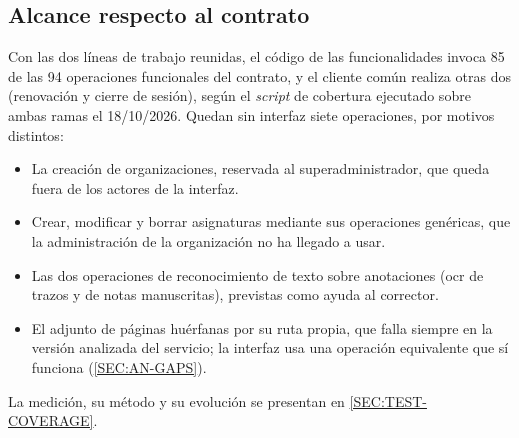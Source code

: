 \subsection{Alcance respecto al contrato}

Con las dos líneas de trabajo reunidas, el código de las funcionalidades invoca 85 de las 94
operaciones funcionales del contrato, y el cliente común realiza otras dos (renovación y
cierre de sesión), según el \textit{script} de cobertura ejecutado sobre ambas ramas el
18/10/2026. Quedan sin interfaz siete operaciones, por motivos distintos:
\begin{itemize}
  \item La creación de organizaciones, reservada al superadministrador, que queda fuera de
        los actores de la interfaz.
  \item Crear, modificar y borrar asignaturas mediante sus operaciones genéricas, que la
        administración de la organización no ha llegado a usar.
  \item Las dos operaciones de reconocimiento de texto sobre anotaciones (\acs{ocr} de trazos
        y de notas manuscritas), previstas como ayuda al corrector.
  \item El adjunto de páginas huérfanas por su ruta propia, que falla siempre en la versión
        analizada del servicio; la interfaz usa una operación equivalente que sí funciona
        (\cref{SEC:AN-GAPS}).
\end{itemize}
La medición, su método y su evolución se presentan en \cref{SEC:TEST-COVERAGE}.
